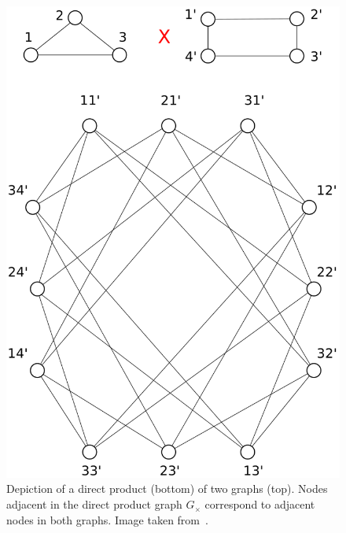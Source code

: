                     \begin{figure}[htbp]
                        \centering
                        \includegraphics[height=.4\textheight]{images/related_work/direct_product_graphs}
                        \caption[
                            Depiction of a direct product of two graphs.
                        ]{
                            \label{fig::direct_product_graph}
                            Depiction of a direct product (bottom) of two graphs (top).
                            Nodes adjacent in the direct product graph $G_{\times}$ correspond to adjacent nodes in both graphs.
                            Image taken from~\parencite{vishwanathan2010graph}.
                        }
                    \end{figure}

